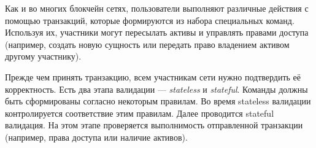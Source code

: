 Как и во многих блокчейн сетях, пользователи  выполняют различные действия с помощью транзакций, которые формируются из набора специальных команд.
Используя их, участники могут пересылать активы и управлять правами доступа (например, создать новую сущность или передать право владением активом другому участнику).

Прежде чем принять транзакцию, всем участникам сети нужно подтвердить её корректность.
Есть два этапа валидации --- \emph{stateless} и \emph{sta\-te\-ful}.
Команды должны быть сформированы согласно некоторым правилам.
Во время stateless валидации контролируется соответствие этим правилам.
Далее проводится stateful валидация. 
На этом этапе проверяется выполнимость отправленной транзакции (например, права доступа или наличие активов).
